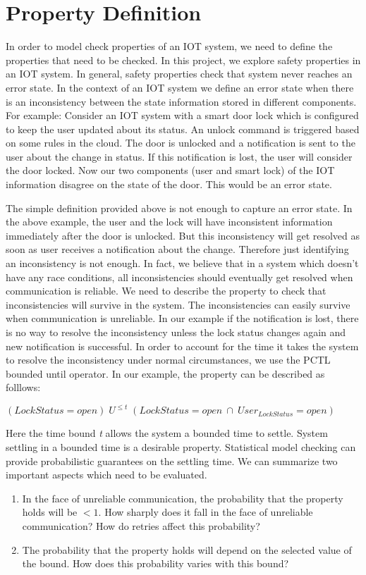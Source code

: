 \section{Property Definition}
In order to model check properties of an IOT system, we need to define the properties that need to be checked. In this project, we explore safety properties in an IOT system. In general, safety properties check that system never reaches an error state. In the context of an IOT system we define an error state when there is an inconsistency between the state information stored in different components. For example: Consider an IOT system with a smart door lock which is configured to keep the user updated about its status. An unlock command is triggered based on some rules in the cloud. The door is unlocked and a notification is sent to the user about the change in status. If this notification is lost, the user will consider the door locked. Now our two components (user and smart lock) of the IOT information disagree on the state of the door. This would be an error state. 

The simple definition provided above is not enough to capture an error state. In the above example, the user and the lock will have inconsistent information immediately after the door is unlocked. But this inconsistency will get resolved as soon as user receives a notification about the change. Therefore just identifying an inconsistency is not enough. In fact, we believe that in a system which doesn't have any race conditions, all inconsistencies should eventually get resolved when communication is reliable. We need to describe the property to check that inconsistencies will survive in the system. The inconsistencies can easily survive when communication is unreliable. In our example if the notification is lost, there is no way to resolve the inconsistency unless the lock status changes again and new notification is successful. In order to account for the time it takes the system to resolve the inconsistency under normal circumstances, we use the PCTL bounded until operator. In our example, the property can be described as folllows:

{\centering
$(LockStatus = open)\;  U^{\leq t}\; (LockStatus = open\:  \cap\: User_{LockStatus} = open)$\par
}

Here the time bound \textit{t} allows the system a bounded time to settle. System settling in a bounded time is a desirable property. Statistical model checking can provide probabilistic guarantees on the settling time. We can summarize two important aspects which need to be evaluated.
\begin{enumerate}
  \item In the face of unreliable communication, the probability that the property holds will be $<1$. How sharply does it fall in the face of unreliable communication? How do retries affect this probability?
  \item The probability that the property holds will depend on the selected value of the bound. How does this probability varies with this bound?
\end{enumerate}